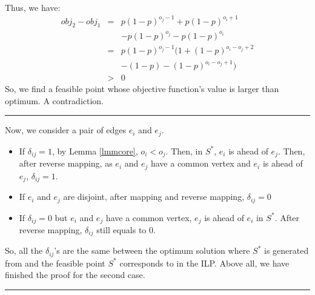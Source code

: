 \documentclass[letterpaper]{article}
\newenvironment{proof}{{Proof:}}{\hfill\rule{2mm}{2mm}}
\begin{document}
\begin{proof}
\begin{proof}
\begin{eqnarray}
		\end{eqnarray} 
		Thus, we have:
		\begin{eqnarray}
		obj_2-obj_1&=& p(1-p)^{o_j-1}+p(1-p)^{o_i+1}\nonumber\\&&-p(1-p)^{o_j}-p(1-p)^{o_i}\nonumber\\
		&=& p(1-p)^{o_j-1}(1+(1-p)^{o_i-o_j+2}\nonumber\\&& -(1-p)-(1-p)^{o_i-o_j+1})\nonumber\\
		&>& 0\nonumber
		\end{eqnarray}
		So, we find a feasible point whose objective function's value is larger than optimum.
		A contradiction.
	\end{proof}
	Now, we consider a pair of edges $e_i$ and $e_j$. 
	\begin{itemize}
		\item If $\delta_{ij}=1$, by Lemma \ref{lmmcore}, $o_i<o_j$. 
		Then, in $S^*$, $e_i$ is ahead of $e_j$.
		Then, after reverse mapping, as $e_i$ and $e_j$ have a common vertex and $e_i$ is ahead of $e_j$, $\delta_{ij}=1$.
		\item If $e_i$ and $e_j$ are disjoint, after mapping and reverse mapping, $\delta_{ij}=0$
		\item If $\delta_{ij}=0$ but $e_i$ and $e_j$ have a common vertex, $e_j$ is ahead of $e_i$ in $S^*$.
		After reverse mapping, $\delta_{ij}$ still equals to 0.
	\end{itemize}
	So, all the $\delta_{ij}$'s are the same between the optimum solution where $S^*$ is generated from and the feasible point $S^*$ corresponds to in the ILP.
	Above all, we have finished the proof for the second case. 
\end{proof}


\newpage


\end{document}
